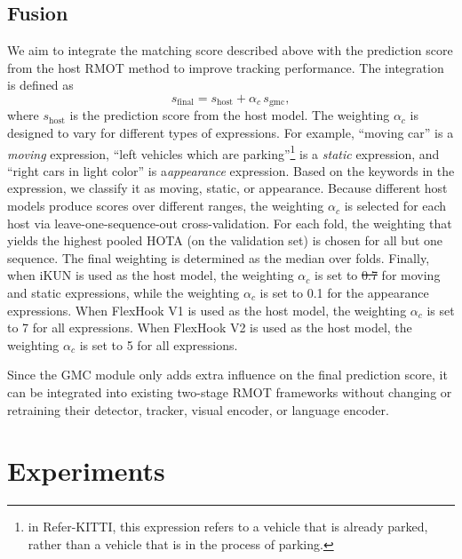 \documentclass{article}
\makeatletter
\providecommand{\DIFadd}[1]{{\protect\color{blue}\uwave{#1}}} %
\providecommand{\DIFdel}[1]{{\protect\color{red}\sout{#1}}} %
\providecommand{\DIFaddbegin}{} %
\providecommand{\DIFaddend}{} %
\providecommand{\DIFdelbegin}{} %
\providecommand{\DIFdelend}{} %
\providecommand{\DIFscaledelfig}{0.5}
\newlength{\DIFdelgraphicswidth} %
\newlength{\DIFdelgraphicsheight} %
\providecommand{\DIFaddincludegraphics}[2][]{{\color{blue}\fbox{\DIFOincludegraphics[#1]{#2}}}} %
\providecommand{\DIFdelincludegraphics}[2][]{%
\sbox{\DIFdelgraphicsbox}{\DIFOincludegraphics[#1]{#2}}%
\settoboxwidth{\DIFdelgraphicswidth}{\DIFdelgraphicsbox} %
\settoboxtotalheight{\DIFdelgraphicsheight}{\DIFdelgraphicsbox} %
\scalebox{\DIFscaledelfig}{%
\parbox[b]{\DIFdelgraphicswidth}{\usebox{\DIFdelgraphicsbox}\\[-\baselineskip] \rule{\DIFdelgraphicswidth}{0em}}\llap{\resizebox{\DIFdelgraphicswidth}{\DIFdelgraphicsheight}{%
\setlength{\unitlength}{\DIFdelgraphicswidth}%
\begin{picture}(1,1)%
\thicklines\linethickness{2pt} %
{\color[rgb]{1,0,0}\put(0,0){\framebox(1,1){}}}%
{\color[rgb]{1,0,0}\put(0,0){\line( 1,1){1}}}%
{\color[rgb]{1,0,0}\put(0,1){\line(1,-1){1}}}%
\end{picture}%
}\hspace*{3pt}}} %
} %
\DeclareRobustCommand{\DIFaddbegin}{\DIFOaddbegin \let\includegraphics\DIFaddincludegraphics} %
\DeclareRobustCommand{\DIFaddend}{\DIFOaddend \let\includegraphics\DIFOincludegraphics} %
\DeclareRobustCommand{\DIFdelbegin}{\DIFOdelbegin \let\includegraphics\DIFdelincludegraphics} %
\DeclareRobustCommand{\DIFdelend}{\DIFOaddend \let\includegraphics\DIFOincludegraphics} %
\let\sout@orig\sout %
\renewcommand{\sout}[1]{\ifmmode\text{\sout@orig{\ensuremath{#1}}}\else\sout@orig{#1}\fi} %
\makeatother
\begin{document}
\subsection{Fusion}
\label{sec:fusion}
We aim to integrate the matching score described above with the prediction score from the host RMOT method to improve tracking performance. The integration is defined as
\begin{equation}
  s_{\mathrm{final}} = s_{\mathrm{host}} + \alpha_{c}\,s_{\mathrm{gmc}},
  \label{eq:fusion}
\end{equation}
where $s_{\mathrm{host}}$ is the prediction score from the host model. The weighting $\alpha_c$ is designed to vary for different types of expressions. For example, \enquote{moving car} is a \emph{moving} expression, \enquote{left vehicles which are parking}\footnote{in Refer-KITTI, this expression refers to a vehicle that is already parked, rather than a vehicle that is in the process of parking.} is a \emph{static} expression, and \enquote{right cars in light color} is a\DIFaddbegin \DIFadd{n}\DIFaddend  \emph{appearance} expression. Based on the keywords in the expression, we classify it as moving, static, or appearance. Because different host models produce scores over different ranges, the weighting $\alpha_c$ is selected for each host via leave-one-sequence-out cross-validation. For each fold, the weighting that yields the highest pooled HOTA (on the validation set) is chosen for all but one sequence. The final weighting is determined as the median over folds. Finally, when iKUN is used as the host model, the weighting $\alpha_c$ is set to \DIFdelbegin \DIFdel{0.7 }\DIFdelend \DIFaddbegin \DIFadd{1.0 }\DIFaddend for moving and static expressions, while the weighting $\alpha_c$ is set to 0.1 for the appearance expressions. When FlexHook V1 is used as the host model, the weighting $\alpha_c$ is set to 7 for all expressions. When FlexHook V2 is used as the host model, the weighting $\alpha_c$ is set to 5 for all expressions.

Since the GMC module only adds extra influence on the final prediction score, it can be integrated into existing two-stage RMOT frameworks without changing or retraining their detector, tracker, visual encoder, or language encoder.

\section{Experiments}
\label{sec:exp}
\end{document}
